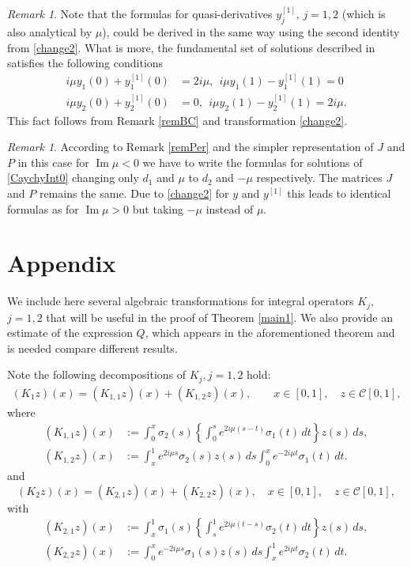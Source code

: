 \documentclass[11pt]{amsart}
\theoremstyle{plain}
\theoremstyle{definition}
\theoremstyle{remark}
\newtheorem{rem}[thm]{Remark}
\numberwithin{equation}{section}
\renewcommand\Im{\operatorname{Im}}
\begin{document}
\begin{rem}
Note that the formulas for quasi-derivatives  $y^{[1]}_j$, $j=1,2$ (which is also analytical by $\mu$), could be derived in the same way using
the second identity from \eqref{change2}. What is more, the fundamental set of solutions described in satisfies
the following conditions
\begin{align*}
i\mu y_1(0)+y_1^{[1]}(0)&=2i\mu, \ \ i\mu y_1(1)-y_1^{[1]}(1)=0\\
i\mu y_2(0)+y_2^{[1]}(0)&=0, \ \ i\mu y_2(1)-y_2^{[1]}(1)=2i\mu.
\end{align*}
This fact follows from Remark \ref{remBC} and transformation \eqref{change2}.
\end{rem}

\begin{rem}
According to Remark \ref{remPer} and the simpler representation of $J$ and $P$ in this case
for $\Im \mu <0$ we have to write the formulas for solutions of
\eqref{CaychyInt0} changing only $d_1$ and $\mu$ to $d_2$ and $-\mu$ respectively. The matrices $J$ and $P$ remains the same.
Due to \eqref{change2} for $y$ and $y^{[1]}$ this leads to identical formulas as for $\Im \mu >0$ but taking
$-\mu$ instead of $\mu$.
\end{rem}

\section{Appendix}
We include here several algebraic transformations for integral operators $K_j$, $j=1,2$ that will be useful in the
proof of Theorem \ref{main1}. We also provide an estimate of the expression
$Q$, which appears in the aforementioned theorem and is needed compare different results.

Note the following decompositions of $K_j,j=1,2$ hold:
\begin{align}\label{Sum1}
(K_1z)(x)=(K_{1,1}z)(x)+
(K_{1,2}z)(x),\qquad x\in [0,1],\quad z\in \mathcal{C}[0,1],
\end{align}
where
\begin{align}\label{K11}
(K_{1,1}z)(x)&:=
\int_0^x\sigma_2(s)
\left\{\int_0^s e^{2i\mu(s-t)}
\sigma_1(t)\,dt\right\}z(s)\,ds,\\
(K_{1,2}z)(x)&:=
\int_x^1e^{2i\mu s}\sigma_2(s)
z(s)\,ds\int_0^x e^{-2i\mu t}
\sigma_1(t)\,dt.\label{K12}
\end{align}
and
\begin{equation}
(K_2z)(x)=(K_{2,1}z)(x)+
(K_{2,2}z)(x),\quad x\in [0,1],\quad z\in \mathcal{C}[0,1],
\end{equation}
with
\begin{align}\label{K21}
(K_{2,1}z)(x)&:=
\int_x^1\sigma_1(s)
\left\{\int_s^1 e^{2i\mu(t-s)}
\sigma_2(t)\,dt\right\}z(s)\,ds,\\
(K_{2,2}z)(x)&:=
\int_0^xe^{-2i\mu s}\sigma_1(s)z(s)\,ds \int_x^1 e^{2i\mu t}
\sigma_2(t)\,dt \label{K22}.
\end{align}
\end{document}
